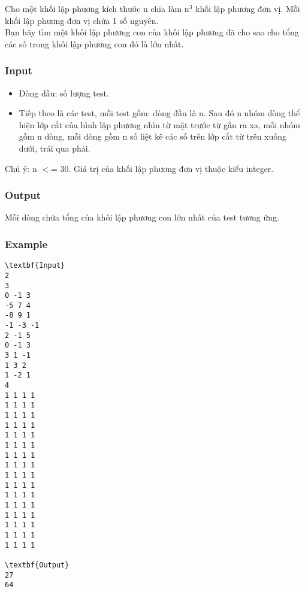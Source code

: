 

Cho một khối lập phương kích thước n chia làm n$^3 $ khối lập phương đơn vị. Mỗi khối lập phương đơn vị chứa 1 số nguyên.
\\Bạn hãy tìm một khối lập phương con của khối lập phương đã cho sao cho tổng các số trong khối lập phương con đó là lớn nhất.

\subsubsection{Input}
\begin{itemize}
	\item Dòng đầu: số lượng test.
	\item Tiếp theo là các test, mỗi test gồm: dòng đầu là n. Sau đó n nhóm dòng thể hiện lớp cắt của hình lập phương nhìn từ mặt trước từ gần ra xa, mỗi nhóm gồm n dòng, mỗi dòng gồm n số liệt kê các số trên lớp cắt từ trên xuống dưới, trái qua phải.
\end{itemize}

Chú ý: n $<$= 30. Giá trị của khối lập phương đơn vị thuộc kiểu integer.

\subsubsection{Output}

Mỗi dòng chứa tổng của khối lập phương con lớn nhất của test tương ứng.

\subsubsection{Example}
\begin{verbatim}
\textbf{Input}
2
3
0 -1 3
-5 7 4
-8 9 1
-1 -3 -1
2 -1 5
0 -1 3
3 1 -1
1 3 2
1 -2 1
4
1 1 1 1
1 1 1 1
1 1 1 1
1 1 1 1
1 1 1 1
1 1 1 1
1 1 1 1
1 1 1 1
1 1 1 1
1 1 1 1
1 1 1 1
1 1 1 1
1 1 1 1
1 1 1 1
1 1 1 1
1 1 1 1

\textbf{Output}
27
64
\end{verbatim}